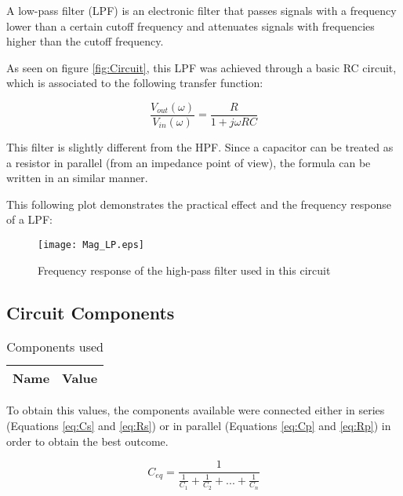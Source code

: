 A low-pass filter (LPF) is an electronic filter that passes signals with a frequency lower than a certain cutoff frequency and attenuates signals with frequencies higher than the cutoff frequency.

As seen on figure \ref{fig:Circuit}, this LPF was achieved through a basic RC circuit, which is associated to the following transfer function:

\begin{equation}
    \frac{V_{out}(\omega)}{V_{in}(\omega)} = \frac{R}{1+j\omega RC}
    \label{eq:trf_function_LPF}
\end{equation}

This filter is slightly different from the HPF. Since a capacitor can be treated as a resistor in parallel (from an impedance point of view), the formula can be written in an similar manner. 

This following plot demonstrates the practical effect and the frequency response of a LPF:

\begin{figure}[H]
    \centering
    \texttt{[image: Mag\_LP.eps]}
    \caption{Frequency response of the high-pass filter used in this circuit}
    \label{fig:freq_response_HPF}
\end{figure}

\subsection{Circuit Components}

\indent

\begin{table}[H]
  \centering
  \begin{tabular}{|l|r|}
    \hline    
    {\bf Name} & {\bf Value} \\ \hline
    
  \end{tabular}
  \caption{Components used }
  \label{tab:Components}
\end{table}

To obtain this values, the components available were connected either in series (Equations \ref{eq:Cs} and \ref{eq:Rs}) or in parallel (Equations \ref{eq:Cp} and \ref{eq:Rp}) in order to obtain the best outcome. 

\begin{equation}
    C_{eq}= \frac{1}{\frac{1}{C_1}+\frac{1}{C_2}+...+\frac{1}{C_n}}
    \label{eq:Cs}
\end{equation}

